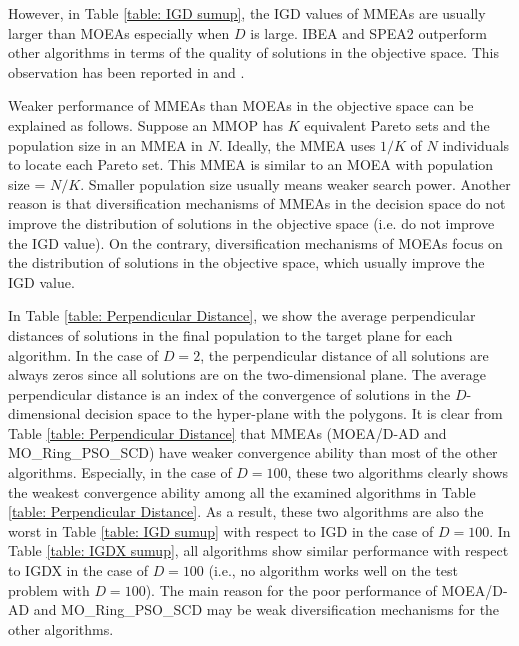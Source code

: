 \documentclass[conference]{IEEEtran}
\begin{document}
 However, in Table \ref{table: IGD sumup}, the IGD values of MMEAs are usually larger than MOEAs especially when $D$ is large. IBEA and SPEA2 outperform other algorithms in terms of the quality of solutions in the objective space. This observation has been reported in \cite{liang2016multimodal} and \cite{shir2009enhancing}. 
 
 Weaker performance of MMEAs than MOEAs in the objective space can be explained as follows. Suppose an MMOP has $K$ equivalent Pareto sets and the population size in an MMEA in $N$. Ideally, the MMEA uses $1/K$ of $N$ individuals to locate each Pareto set. This MMEA is similar to an MOEA with population size = $N/K$. Smaller population size usually means weaker search power. Another reason is that diversification mechanisms of MMEAs in the decision space do not improve the distribution of solutions in the objective space (i.e. do not improve the IGD value). On the contrary, diversification mechanisms of MOEAs focus on the distribution of solutions in the objective space, which usually improve the IGD value. 
 
 In Table \ref{table: Perpendicular Distance}, we show the average perpendicular distances of solutions in the final population to the target plane for each algorithm. In the case of $D=2$, the perpendicular distance of all solutions are always zeros since all solutions are on the two-dimensional plane. The average perpendicular distance is an index of the convergence of solutions in the $D$-dimensional decision space to the hyper-plane with the polygons. It is clear from Table \ref{table: Perpendicular Distance} that  MMEAs (MOEA/D-AD and MO\_Ring\_PSO\_SCD) have weaker convergence ability than most of the other algorithms. Especially, in the case of $D=100$, these two algorithms clearly shows the weakest convergence ability among all the examined algorithms in Table \ref{table: Perpendicular Distance}. As a result, these two algorithms are also the worst in Table \ref{table: IGD sumup} with respect to IGD in the case of $D = 100$. In Table \ref{table: IGDX sumup}, all algorithms show similar performance with respect to IGDX in the case of $D=100$ (i.e., no algorithm works well on the test problem with $D=100$). The main reason for the poor performance of MOEA/D-AD and MO\_Ring\_PSO\_SCD may be weak diversification mechanisms for the other algorithms.
\end{document}

